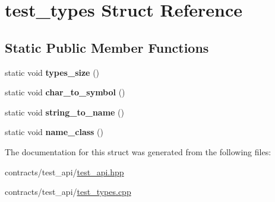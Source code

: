 \hypertarget{structtest__types}{}\section{test\+\_\+types Struct Reference}
\label{structtest__types}
\subsection*{Static Public Member Functions}
\begin{DoxyCompactItemize}
\item 
\mbox{\label{structtest__types_aa956869f7c72f88feef9877e40def39e}} 
static void {\bfseries types\+\_\+size} ()
\item 
\mbox{\label{structtest__types_ad0393cedbfe296d537cd67068c675771}} 
static void {\bfseries char\+\_\+to\+\_\+symbol} ()
\item 
\mbox{\label{structtest__types_ae6af36fcb29ce4bd2103714934d41b09}} 
static void {\bfseries string\+\_\+to\+\_\+name} ()
\item 
\mbox{\label{structtest__types_ac4695afaf043d09ad7c811f365a3359f}} 
static void {\bfseries name\+\_\+class} ()
\end{DoxyCompactItemize}


The documentation for this struct was generated from the following files\+:\begin{DoxyCompactItemize}
\item 
contracts/test\+\_\+api/\mbox{\hyperlink{test__api_8hpp}{test\+\_\+api.\+hpp}}\item 
contracts/test\+\_\+api/\mbox{\hyperlink{test__types_8cpp}{test\+\_\+types.\+cpp}}\end{DoxyCompactItemize}
